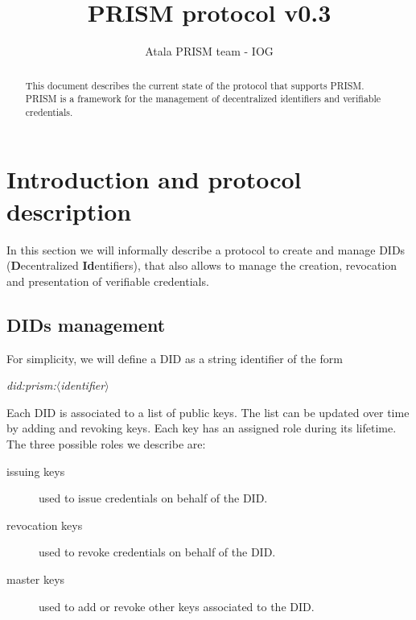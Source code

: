 \documentclass[10pt,a4paper]{article}
\title{PRISM protocol v0.3}
\author{Atala PRISM team - IOG}
\date{}
\begin{document}
\maketitle 

\begin{abstract} 
This document describes the current state of the protocol that supports PRISM. PRISM is a framework for the management of decentralized identifiers and verifiable credentials. 
\end{abstract}

\setcounter{tocdepth}{3} 

\tableofcontents 
\newpage 


\section{Introduction and protocol description}

In this section we will informally describe a protocol to create and manage DIDs (\textbf{D}ecentralized \textbf{Id}entifiers), that also allows to manage the creation, revocation and presentation of verifiable credentials.

\subsection{DIDs management}

For simplicity, we will define a DID as a string identifier of the form 

\begin{center}
	\emph{did:prism:$\langle$identifier$\rangle$}
\end{center}

Each DID is associated to a list of public keys. The list can be updated over time by adding and revoking keys. Each key has an assigned role during its lifetime. The three possible roles we describe are:

\begin{description}
\item[issuing keys] used to issue credentials on behalf of the DID.
\item[revocation keys] used to revoke credentials on behalf of the DID.
\item[master keys] used to add or revoke other keys associated to the DID.
\end{description}
\end{document}
